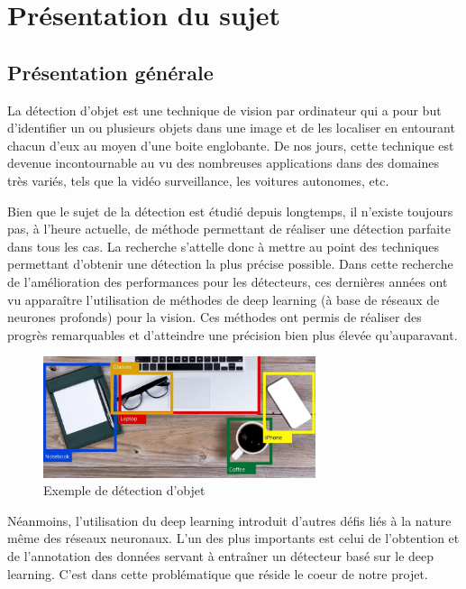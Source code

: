 \chapter{Présentation du sujet}
\label{chap:presentation}
\section{Présentation générale}
La détection d'objet est une technique de vision par ordinateur qui a pour but d'identifier un ou plusieurs objets dans une image et de les localiser en entourant chacun d'eux au moyen d'une boite englobante. De nos jours, cette technique est devenue incontournable au vu des nombreuses applications dans des domaines très variés, tels que la vidéo surveillance, les voitures autonomes, etc.

Bien que le sujet de la détection est étudié depuis longtemps, il n'existe toujours pas, à l'heure actuelle, de méthode permettant de réaliser une détection parfaite dans tous les cas. La recherche s'attelle donc à mettre au point des techniques permettant d'obtenir une détection la plus précise possible. Dans cette recherche de l'amélioration des performances pour les détecteurs, ces dernières années ont vu apparaître l'utilisation de méthodes de deep learning (à base de réseaux de neurones profonds) pour la vision. Ces méthodes ont permis de réaliser des progrès remarquables et d'atteindre une précision bien plus élevée qu'auparavant.

\begin{figure}[!ht]
  \centering
  \includegraphics[width=8cm]{img/object-detection.jpeg}
  \caption{Exemple de détection d'objet}
  \label{fig:obj-det-example}
\end{figure}

Néanmoins, l'utilisation du deep learning introduit d'autres défis liés à la nature même des réseaux neuronaux. L'un des plus importants est celui de l'obtention et de l'annotation des données servant à entraîner un détecteur basé sur le deep learning. C'est dans cette problématique que réside le coeur de notre projet.


